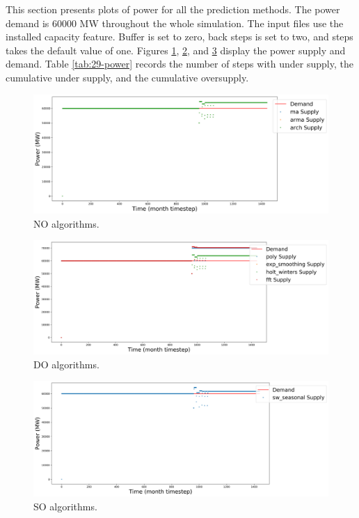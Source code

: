 \documentclass[11pt]{article}
\begin{document}
This section presents plots of power for all the prediction methods. The power demand is 60000 MW throughout the whole simulation. The input files use the installed capacity feature. Buffer is set to zero, back steps is set to two, and steps takes the default value of one.
Figures \ref{fig:29-NO}, \ref{fig:29-DO}, and \ref{fig:29-SO} display the power supply and demand.
Table \ref{tab:29-power} records the number of steps with under supply, the cumulative under supply, and the cumulative oversupply.

\begin{figure}[H]
	\centering
	\includegraphics[width=\textwidth]{29-figures/29-power0-buffer01.png} 
	\hfill
	\caption{NO algorithms.}
	\label{fig:29-NO}
\end{figure}

\begin{figure}[H]
	\centering
	\includegraphics[width=\textwidth]{29-figures/29-power0-buffer02.png} 
	\hfill
	\caption{DO algorithms.}
	\label{fig:29-DO}
\end{figure}

\begin{figure}[H]
	\centering
	\includegraphics[width=\textwidth]{29-figures/29-power0-buffer03.png} 
	\hfill
	\caption{SO algorithms.}
	\label{fig:29-SO}
\end{figure}
\end{document}
